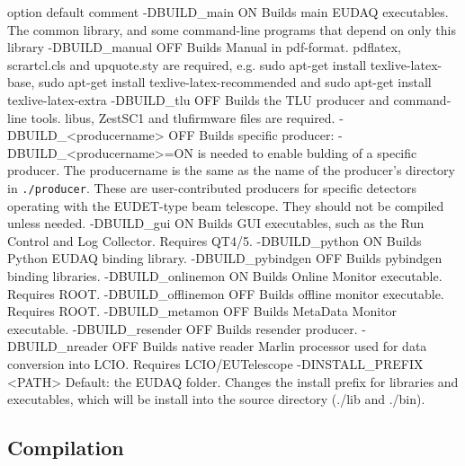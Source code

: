 option  default   comment
-DBUILD\_main  ON  Builds main EUDAQ executables.
The common library, and some command-line programs that depend on only this library
-DBUILD\_manual  OFF   Builds Manual in pdf-format. pdflatex, scrartcl.cls and upquote.sty are required, e.g. sudo apt-get install texlive-latex-base, sudo apt-get install texlive-latex-recommended and sudo apt-get install texlive-latex-extra
-DBUILD\_tlu   OFF   Builds the TLU producer and command-line tools. libus, ZestSC1 and tlufirmware files are required. 
-DBUILD\_<producername>  OFF   Builds specific producer: -DBUILD\_<producername>=ON is needed to enable bulding of a specific producer.
The producername is the same as the name of the producer's directory in \texttt{./producer}. 
These are user-contributed producers for specific detectors operating with the EUDET-type beam telescope. They should not be compiled unless needed.
-DBUILD\_gui   ON  Builds GUI executables, such as the Run Control and Log Collector. Requires QT4/5.
-DBUILD\_python  ON  Builds Python EUDAQ binding library.
-DBUILD\_pybindgen   OFF   Builds pybindgen binding libraries.
-DBUILD\_onlinemon   ON  Builds Online Monitor executable. Requires ROOT.
-DBUILD\_offlinemon  OFF   Builds offline monitor executable. Requires ROOT.
-DBUILD\_metamon   OFF   Builds MetaData Monitor executable.
-DBUILD\_resender  OFF   Builds resender producer.
-DBUILD\_nreader   OFF   Builds native reader Marlin processor used for data conversion into LCIO. Requires LCIO/EUTelescope
-DINSTALL\_PREFIX  <PATH>  Default: the EUDAQ folder. Changes the install prefix for libraries and executables, which will be install into the source directory (./lib and ./bin).%
%


\subsection{Compilation}

